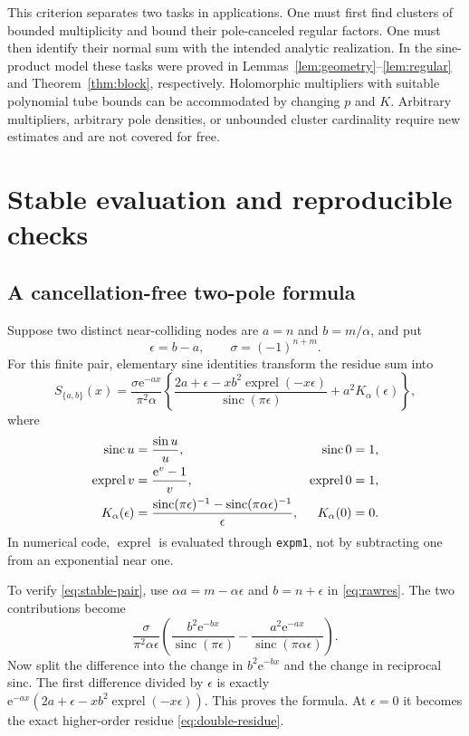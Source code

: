 \documentclass[11pt,a4paper]{article}
\numberwithin{equation}{section}
\theoremstyle{definition}
\theoremstyle{remark}
\newcommand{\e}{\mathrm e}
\newcommand{\sinc}{\operatorname{sinc}}
\newcommand{\exprel}{\operatorname{exprel}}
\begin{document}
This criterion separates two tasks in applications. One must first find
clusters of bounded multiplicity and bound their pole-canceled regular
factors. One must then identify their normal sum with the intended
analytic realization. In the sine-product model these tasks were proved
in Lemmas~\ref{lem:geometry}--\ref{lem:regular} and
Theorem~\ref{thm:block}, respectively. Holomorphic multipliers with
suitable polynomial tube bounds can be accommodated by changing $p$ and
$K$. Arbitrary multipliers, arbitrary pole densities, or unbounded
cluster cardinality require new estimates and are not covered for free.

\section{Stable evaluation and reproducible checks}
\label{sec:computation}

\subsection{A cancellation-free two-pole formula}
Suppose two distinct near-colliding nodes are
$a=n$ and $b=m/\alpha$, and put
\[
 \epsilon=b-a,\qquad \sigma=(-1)^{n+m}.
\]
For this finite pair, elementary sine identities transform the residue
sum into
\begin{equation}
 S_{\{a,b\}}(x)=\frac{\sigma\e^{-ax}}{\pi^2\alpha}
 \left\{
 \frac{2a+\epsilon-xb^2\exprel(-x\epsilon)}{\sinc(\pi\epsilon)}
       +a^2K_\alpha(\epsilon)\right\},
 \label{eq:stable-pair}
\end{equation}
where
\begin{align}
 \sinc u&=\frac{\sin u}{u},& \sinc0&=1,\notag\\
 \exprel v&=\frac{\e^v-1}{v},& \exprel0&=1,\label{eq:stable-functions}\\
 K_\alpha(\epsilon)
 &=\frac{\sinc(\pi\epsilon)^{-1}
            -\sinc(\pi\alpha\epsilon)^{-1}}{\epsilon},
 &K_\alpha(0)&=0.\notag
\end{align}
In numerical code, $\exprel$ is evaluated through \texttt{expm1}, not by
subtracting one from an exponential near one.

To verify \eqref{eq:stable-pair}, use $\alpha a=m-\alpha\epsilon$ and
$b=n+\epsilon$ in \eqref{eq:rawres}. The two contributions become
\[
 \frac{\sigma}{\pi^2\alpha\epsilon}
 \left(\frac{b^2\e^{-bx}}{\sinc(\pi\epsilon)}
       -\frac{a^2\e^{-ax}}{\sinc(\pi\alpha\epsilon)}\right).
\]
Now split the difference into the change in $b^2\e^{-bx}$ and the
change in reciprocal sinc. The first difference divided by $\epsilon$
is exactly
$\e^{-ax}(2a+\epsilon-xb^2\exprel(-x\epsilon))$.
This proves the formula. At $\epsilon=0$ it becomes the exact
higher-order residue \eqref{eq:double-residue}.
\end{document}
